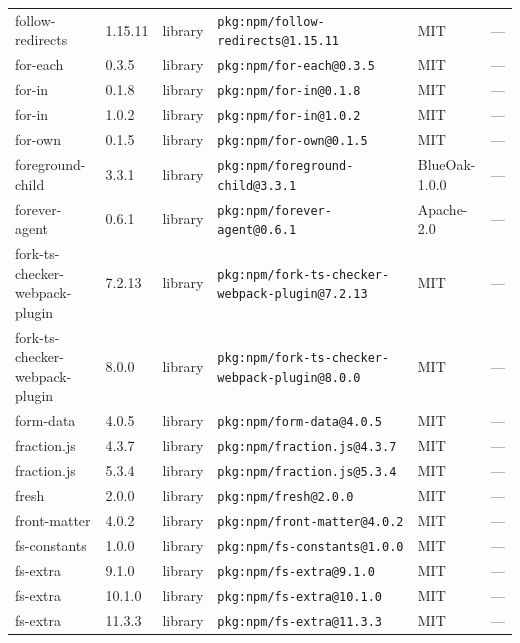 \documentclass[11pt,a4paper]{article}
\begin{document}
\begin{longtable}{|p{4cm}|p{2cm}|p{1.6cm}|p{5cm}|p{1.5cm}|p{3.5cm}|}
\raggedright follow-redirects & 1.15.11 & library & \small\texttt{pkg:npm/follow-redirects@1.15.11} & MIT & \small — \\
\raggedright for-each & 0.3.5 & library & \small\texttt{pkg:npm/for-each@0.3.5} & MIT & \small — \\
\raggedright for-in & 0.1.8 & library & \small\texttt{pkg:npm/for-in@0.1.8} & MIT & \small — \\
\raggedright for-in & 1.0.2 & library & \small\texttt{pkg:npm/for-in@1.0.2} & MIT & \small — \\
\raggedright for-own & 0.1.5 & library & \small\texttt{pkg:npm/for-own@0.1.5} & MIT & \small — \\
\raggedright foreground-child & 3.3.1 & library & \small\texttt{pkg:npm/foreground-child@3.3.1} & BlueOak-1.0.0 & \small — \\
\raggedright forever-agent & 0.6.1 & library & \small\texttt{pkg:npm/forever-agent@0.6.1} & Apache-2.0 & \small — \\
\raggedright fork-ts-checker-webpack-plugin & 7.2.13 & library & \small\texttt{pkg:npm/fork-ts-checker-webpack-plugin@7.2.13} & MIT & \small — \\
\raggedright fork-ts-checker-webpack-plugin & 8.0.0 & library & \small\texttt{pkg:npm/fork-ts-checker-webpack-plugin@8.0.0} & MIT & \small — \\
\raggedright form-data & 4.0.5 & library & \small\texttt{pkg:npm/form-data@4.0.5} & MIT & \small — \\
\raggedright fraction.js & 4.3.7 & library & \small\texttt{pkg:npm/fraction.js@4.3.7} & MIT & \small — \\
\raggedright fraction.js & 5.3.4 & library & \small\texttt{pkg:npm/fraction.js@5.3.4} & MIT & \small — \\
\raggedright fresh & 2.0.0 & library & \small\texttt{pkg:npm/fresh@2.0.0} & MIT & \small — \\
\raggedright front-matter & 4.0.2 & library & \small\texttt{pkg:npm/front-matter@4.0.2} & MIT & \small — \\
\raggedright fs-constants & 1.0.0 & library & \small\texttt{pkg:npm/fs-constants@1.0.0} & MIT & \small — \\
\raggedright fs-extra & 9.1.0 & library & \small\texttt{pkg:npm/fs-extra@9.1.0} & MIT & \small — \\
\raggedright fs-extra & 10.1.0 & library & \small\texttt{pkg:npm/fs-extra@10.1.0} & MIT & \small — \\
\raggedright fs-extra & 11.3.3 & library & \small\texttt{pkg:npm/fs-extra@11.3.3} & MIT & \small — \\

\end{longtable}
\end{document}
